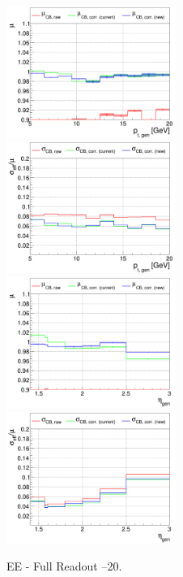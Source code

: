 \begin{figure}
\includegraphics[width=0.495\textwidth]{./plots_pdf/ECAL_plots/plotsPU/EE/FULL/pdf/GENPT/EEFULL_GENPT_0005_0020_MuOverBins.pdf}
\includegraphics[width=0.495\textwidth]{./plots_pdf/ECAL_plots/plotsPU/EE/FULL/pdf/GENPT/EEFULL_GENPT_0005_0020_EffSigmaOverBins.pdf}
\includegraphics[width=0.495\textwidth]{./plots_pdf/ECAL_plots/plotsPU/EE/FULL/pdf/GENETA/EEFULL_GENETA_0005_0020_MuOverBins.pdf}
\includegraphics[width=0.495\textwidth]{./plots_pdf/ECAL_plots/plotsPU/EE/FULL/pdf/GENETA/EEFULL_GENETA_0005_0020_EffSigmaOverBins.pdf}
\caption{EE - Full Readout --20\GeV.}
\end{figure}

